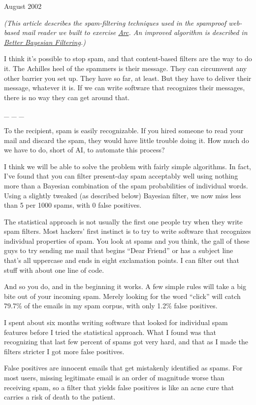 August 2002

\emph{(This article describes the spam-filtering techniques used in the
spamproof web-based mail reader we built to exercise
\href{arc.html}{Arc}. An improved algorithm is described in
\href{better.html}{Better Bayesian Filtering}.)}

I think it's possible to stop spam, and that content-based filters are
the way to do it. The Achilles heel of the spammers is their message.
They can circumvent any other barrier you set up. They have so far, at
least. But they have to deliver their message, whatever it is. If we can
write software that recognizes their messages, there is no way they can
get around that.

\_ \_ \_

To the recipient, spam is easily recognizable. If you hired someone to
read your mail and discard the spam, they would have little trouble
doing it. How much do we have to do, short of AI, to automate this
process?

I think we will be able to solve the problem with fairly simple
algorithms. In fact, I've found that you can filter present-day spam
acceptably well using nothing more than a Bayesian combination of the
spam probabilities of individual words. Using a slightly tweaked (as
described below) Bayesian filter, we now miss less than 5 per 1000
spams, with 0 false positives.

The statistical approach is not usually the first one people try when
they write spam filters. Most hackers' first instinct is to try to write
software that recognizes individual properties of spam. You look at
spams and you think, the gall of these guys to try sending me mail that
begins ``Dear Friend'' or has a subject line that's all uppercase and
ends in eight exclamation points. I can filter out that stuff with about
one line of code.

And so you do, and in the beginning it works. A few simple rules will
take a big bite out of your incoming spam. Merely looking for the word
``click'' will catch 79.7\% of the emails in my spam corpus, with only
1.2\% false positives.

I spent about six months writing software that looked for individual
spam features before I tried the statistical approach. What I found was
that recognizing that last few percent of spams got very hard, and that
as I made the filters stricter I got more false positives.

False positives are innocent emails that get mistakenly identified as
spams. For most users, missing legitimate email is an order of magnitude
worse than receiving spam, so a filter that yields false positives is
like an acne cure that carries a risk of death to the patient.

